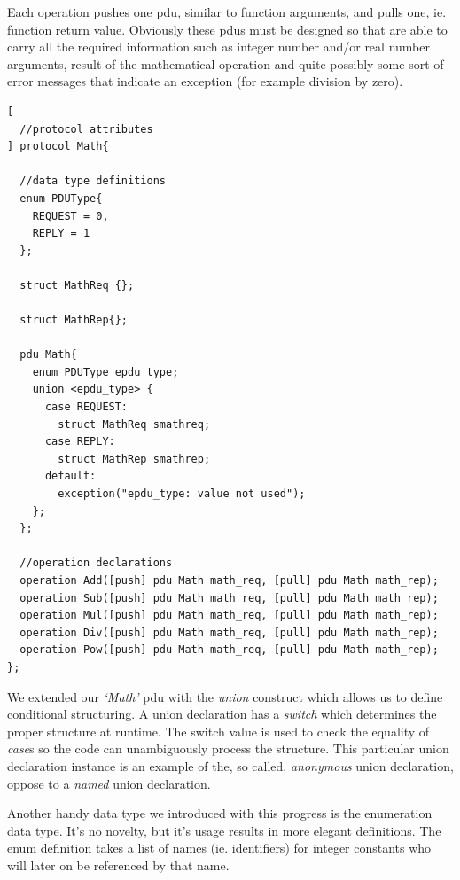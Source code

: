 \documentclass[times, utf8, diplomski]{fer}
\begin{document}
Each operation pushes one pdu, similar to function arguments, and pulls one, ie. 
function return value. Obviously these pdus must be designed so that are able to 
carry all the required information such as integer number and/or real number 
arguments, result of the mathematical operation and quite possibly some sort of 
error messages that indicate an exception (for example division by zero).

\lstset{language=IDL}
\lstset{basicstyle=\tiny}
\lstset{numbers=left, numberstyle=\tiny, stepnumber=1, numbersep=5pt}
\begin{lstlisting}[frame=tb]
[
  //protocol attributes
] protocol Math{

  //data type definitions
  enum PDUType{ 
    REQUEST = 0, 
    REPLY = 1 
  }; 

  struct MathReq {};

  struct MathRep{};

  pdu Math{
    enum PDUType epdu_type; 
    union <epdu_type> { 
      case REQUEST: 
        struct MathReq smathreq; 
      case REPLY: 
        struct MathRep smathrep; 
      default: 
        exception("epdu_type: value not used"); 
    }; 
  };

  //operation declarations
  operation Add([push] pdu Math math_req, [pull] pdu Math math_rep);
  operation Sub([push] pdu Math math_req, [pull] pdu Math math_rep);
  operation Mul([push] pdu Math math_req, [pull] pdu Math math_rep);
  operation Div([push] pdu Math math_req, [pull] pdu Math math_rep);
  operation Pow([push] pdu Math math_req, [pull] pdu Math math_rep);
};
\end{lstlisting}

We extended our \emph{`Math'} pdu with the \emph{union} construct which allows us 
to define conditional structuring. A union declaration has a \emph{switch} which 
determines the proper structure at runtime. The switch value is used to check 
the equality of \emph{case}s so the code can unambiguously process the structure.
This particular union declaration instance is an example of the, so called, 
\emph{anonymous} union declaration, oppose to a \emph{named} union declaration. 

Another handy data type we introduced with this progress is the enumeration data 
type. It's no novelty, but it's usage results in more elegant definitions. 
The enum definition takes a list of names (ie. identifiers) for integer constants 
who will later on be referenced by that name.
\end{document}
